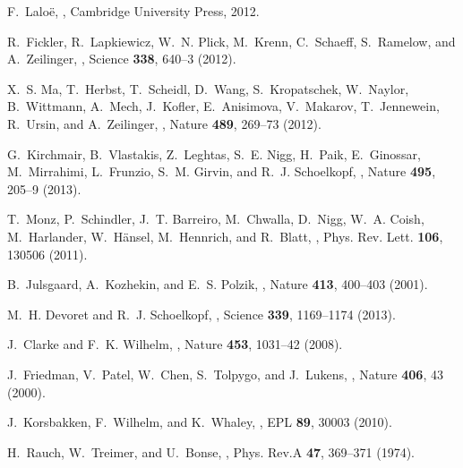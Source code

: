 \documentclass[12pt]{article}
\begin{document}
\begin{thebibliography}{100}
F.~Lalo{\"e},
,
\newblock Cambridge University Press, 2012.

R.~Fickler, R.~Lapkiewicz, W.~N. Plick, M.~Krenn, C.~Schaeff, S.~Ramelow, and
  A.~Zeilinger,
,
\newblock Science {\bf 338}, 640--3 (2012).

X.~S. Ma, T.~Herbst, T.~Scheidl, D.~Wang, S.~Kropatschek, W.~Naylor,
  B.~Wittmann, A.~Mech, J.~Kofler, E.~Anisimova, V.~Makarov, T.~Jennewein,
  R.~Ursin, and A.~Zeilinger,
,
\newblock Nature {\bf 489}, 269--73 (2012).

G.~Kirchmair, B.~Vlastakis, Z.~Leghtas, S.~E. Nigg, H.~Paik, E.~Ginossar,
  M.~Mirrahimi, L.~Frunzio, S.~M. Girvin, and R.~J. Schoelkopf,
,
\newblock Nature {\bf 495}, 205--9 (2013).

T.~Monz, P.~Schindler, J.~T. Barreiro, M.~Chwalla, D.~Nigg, W.~A. Coish,
  M.~Harlander, W.~Hänsel, M.~Hennrich, and R.~Blatt,
,
\newblock Phys. Rev. Lett. {\bf 106}, 130506 (2011).

B.~Julsgaard, A.~Kozhekin, and E.~S. Polzik,
,
\newblock Nature {\bf 413}, 400--403 (2001).

M.~H. Devoret and R.~J. Schoelkopf,
,
\newblock Science {\bf 339}, 1169--1174 (2013).

J.~Clarke and F.~K. Wilhelm,
,
\newblock Nature {\bf 453}, 1031--42 (2008).

J.~Friedman, V.~Patel, W.~Chen, S.~Tolpygo, and J.~Lukens,
,
\newblock Nature {\bf 406}, 43 (2000).

J.~Korsbakken, F.~Wilhelm, and K.~Whaley,
,
\newblock EPL {\bf 89}, 30003 (2010).

H.~Rauch, W.~Treimer, and U.~Bonse,
,
\newblock Phys. Rev.A {\bf 47}, 369--371 (1974).


\end{thebibliography}
\end{document}
